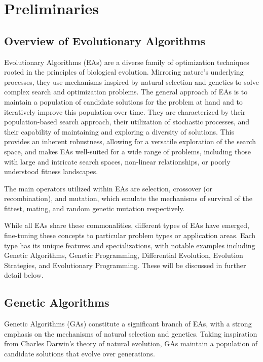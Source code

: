 \documentclass[twoside]{ctuthesis}
\theoremstyle{plain}
\theoremstyle{definition}
\theoremstyle{note}
\begin{document}
\chapter{Preliminaries}


\section{Overview of Evolutionary Algorithms}

Evolutionary Algorithms (EAs) are a diverse family of optimization techniques rooted in the principles of biological evolution. Mirroring nature's underlying processes, they use mechanisms inspired by natural selection and genetics to solve complex search and optimization problems. The general approach of EAs is to maintain a population of candidate solutions for the problem at hand and to iteratively improve this population over time. They are characterized by their population-based search approach, their utilization of stochastic processes, and their capability of maintaining and exploring a diversity of solutions. This provides an inherent robustness, allowing for a versatile exploration of the search space, and makes EAs well-suited for a wide range of problems, including those with large and intricate search spaces, non-linear relationships, or poorly understood fitness landscapes.

The main operators utilized within EAs are selection, crossover (or recombination), and mutation, which emulate the mechanisms of survival of the fittest, mating, and random genetic mutation respectively.

While all EAs share these commonalities, different types of EAs have emerged, fine-tuning these concepts to particular problem types or application areas. Each type has its unique features and specializations, with notable examples including Genetic Algorithms, Genetic Programming, Differential Evolution, Evolution Strategies, and Evolutionary Programming. These will be discussed in further detail below.

\section{Genetic Algorithms}

Genetic Algorithms (GAs) constitute a significant branch of EAs, with a strong emphasis on the mechanisms of natural selection and genetics. Taking inspiration from Charles Darwin's theory of natural evolution, GAs maintain a population of candidate solutions that evolve over generations.
\end{document}

